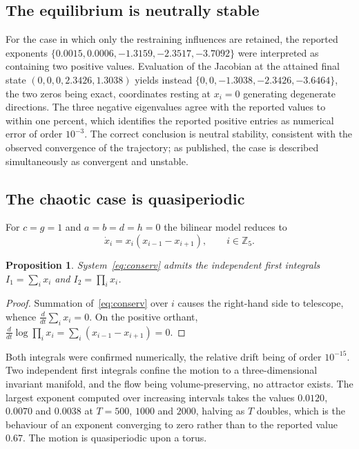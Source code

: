 \documentclass[11pt]{article}
\newcommand{\Z}{{\mathbb{Z}}}
\newtheorem{proposition}[theorem]{Proposition}
\theoremstyle{definition}
\theoremstyle{remark}
\begin{document}
	\subsection*{The equilibrium is neutrally stable}
	
	For the case in which only the restraining influences are retained, the reported
	exponents $\{0.0015,0.0006,-1.3159,-2.3517,-3.7092\}$ were interpreted as containing
	two positive values. Evaluation of the Jacobian at the attained final state
	$(0,0,0,2.3426,1.3038)$ yields instead $\{0,0,-1.3038,-2.3426,-3.6464\}$, the two
	zeros being exact, coordinates resting at $x_i=0$ generating degenerate directions.
	The three negative eigenvalues agree with the reported values to within one percent,
	which identifies the reported positive entries as numerical error of order
	$10^{-3}$. The correct conclusion is neutral stability, consistent with the observed
	convergence of the trajectory; as published, the case is described simultaneously as
	convergent and unstable.
	
	\subsection*{The chaotic case is quasiperiodic}
	
	For $c=g=1$ and $a=b=d=h=0$ the bilinear model reduces to
	\begin{equation}\label{eq:conserv}
		\dot x_i=x_i(x_{i-1}-x_{i+1}),\qquad i\in\Z_5 .
	\end{equation}
	
	\begin{proposition}\label{prop:conserved}
		System~\eqref{eq:conserv} admits the independent first integrals
		$I_1=\sum_i x_i$ and $I_2=\prod_i x_i$.
	\end{proposition}
	
	\begin{proof}
		Summation of~\eqref{eq:conserv} over $i$ causes the right-hand side to telescope,
		whence $\tfrac{d}{dt}\sum_i x_i=0$. On the positive orthant,
		$\tfrac{d}{dt}\log\prod_i x_i=\sum_i(x_{i-1}-x_{i+1})=0$.
	\end{proof}
	
	Both integrals were confirmed numerically, the relative drift being of order
	$10^{-15}$. Two independent first integrals confine the motion to a
	three-dimensional invariant manifold, and the flow being volume-preserving, no
	attractor exists. The largest exponent computed over increasing intervals takes the
	values $0.0120$, $0.0070$ and $0.0038$ at $T=500$, $1000$ and $2000$, halving as $T$
	doubles, which is the behaviour of an exponent converging to zero rather than to the
	reported value $0.67$. The motion is quasiperiodic upon a torus.
	
\end{document}

